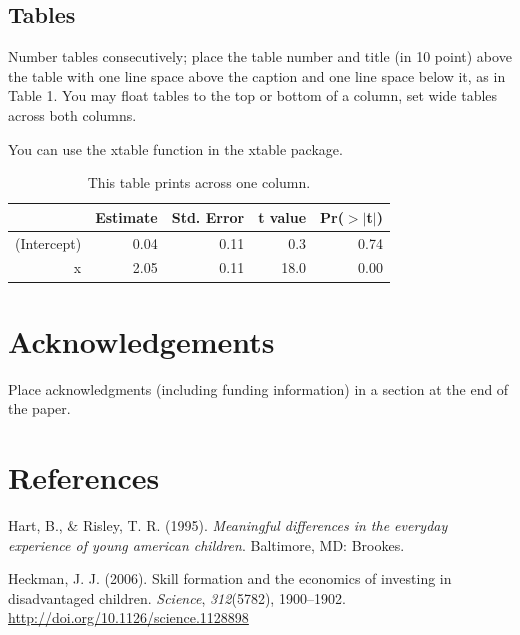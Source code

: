 \documentclass[10pt, letterpaper]{article}
\begin{document}
\subsection{Tables}\label{tables}

Number tables consecutively; place the table number and title (in 10
point) above the table with one line space above the caption and one
line space below it, as in Table 1. You may float tables to the top or
bottom of a column, set wide tables across both columns.

You can use the xtable function in the xtable package.

\begin{table}[H]
\centering
\begin{tabular}{rrrrr}
  \hline
 & Estimate & Std. Error & t value & Pr($>$$|$t$|$) \\ 
  \hline
(Intercept) & 0.04 & 0.11 & 0.3 & 0.74 \\ 
  x & 2.05 & 0.11 & 18.0 & 0.00 \\ 
   \hline
\end{tabular}
\caption{This table prints across one column.} 
\end{table}

\section{Acknowledgements}\label{acknowledgements}

Place acknowledgments (including funding information) in a section at
the end of the paper.

\section{References}\label{references}

\setlength{\parindent}{-0.1in} \setlength{\leftskip}{0.125in} \noindent

\hypertarget{refs}{}
\hypertarget{ref-Hart1995}{}
Hart, B., \& Risley, T. R. (1995). \emph{Meaningful differences in the
everyday experience of young american children}. Baltimore, MD: Brookes.

\hypertarget{ref-Heckman2006}{}
Heckman, J. J. (2006). Skill formation and the economics of investing in
disadvantaged children. \emph{Science}, \emph{312}(5782), 1900--1902.
\url{http://doi.org/10.1126/science.1128898}


\end{document}
